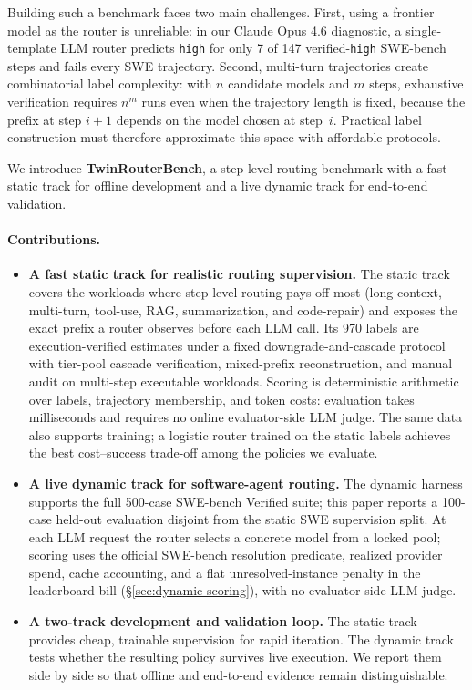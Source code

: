 Building such a benchmark faces two main challenges.
First, using a frontier model as the router is unreliable: in our
Claude Opus 4.6 diagnostic, a single-template LLM router predicts
\texttt{high} for only 7 of 147 verified-\texttt{high} SWE-bench steps and
fails every SWE trajectory.
Second, multi-turn trajectories create combinatorial label complexity: with
$n$ candidate models and $m$ steps, exhaustive verification requires $n^{m}$
runs even when the trajectory length is fixed, because the prefix at step
$i{+}1$ depends on the model chosen at step~$i$. Practical label
construction must therefore approximate this space with
affordable protocols.

We introduce \textbf{TwinRouterBench}, a step-level routing benchmark with a
fast static track for offline development and a live dynamic track for
end-to-end validation.

\paragraph{Contributions.}
\begin{itemize}[leftmargin=*, itemsep=1pt, topsep=2pt]
\item \textbf{A fast static track for realistic routing supervision.}
The static track covers the workloads where step-level routing pays off
most (long-context, multi-turn, tool-use, RAG, summarization, and
code-repair) and exposes the exact prefix a router observes before each LLM
call. Its
970 labels are execution-verified estimates under a fixed
downgrade-and-cascade protocol with tier-pool cascade verification,
mixed-prefix reconstruction, and manual audit on multi-step executable
workloads. Scoring is deterministic arithmetic over labels, trajectory
membership, and token costs: evaluation takes milliseconds and requires no
online evaluator-side LLM judge. The same data also supports training; a
logistic router trained on the static labels achieves the best cost--success
trade-off among the policies we evaluate.
\item \textbf{A live dynamic track for software-agent routing.}
The dynamic harness supports the full 500-case SWE-bench Verified suite; this
paper reports a 100-case held-out evaluation disjoint from the static SWE
supervision split. At each LLM request the router selects a concrete model
from a locked pool; scoring uses the official SWE-bench resolution predicate,
realized provider spend, cache accounting, and a flat unresolved-instance
penalty in the leaderboard bill (\S\ref{sec:dynamic-scoring}), with no
evaluator-side LLM judge.
\item \textbf{A two-track development and validation loop.}
The static track provides cheap, trainable supervision for rapid iteration.
The dynamic track tests whether the resulting policy survives live execution.
We report them side by side so that offline and end-to-end evidence remain
distinguishable.
\end{itemize}
